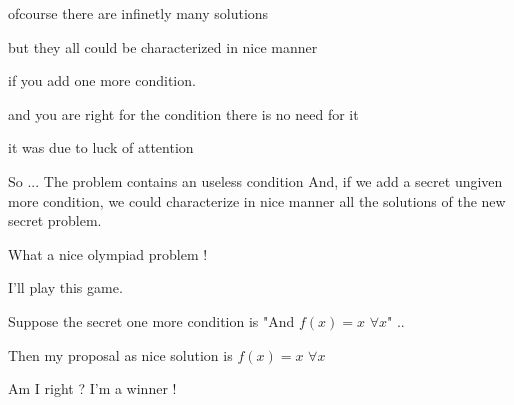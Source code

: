 \begin{solution}
	\begin{tcolorbox}
ofcourse there are infinetly many solutions

but they all could be characterized in nice manner

if you add one more condition.

and you are right for the condition there is no need for it 

it was due to luck of attention\end{tcolorbox}
So ...
 The problem contains an useless condition
 And, if we add a secret ungiven more condition, we could characterize in nice manner all the solutions of the new secret problem.

What a nice olympiad problem !

I'll play this game.

Suppose the secret one more condition is "And $f(x)=x$ $\forall x$" ..

Then my proposal as nice solution is $f(x)=x$ $\forall x$

Am I right ?
I'm a winner !
\end{solution}




